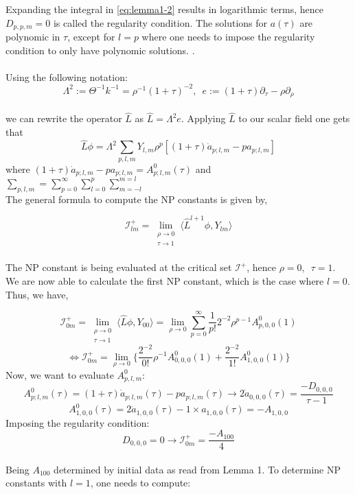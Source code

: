 \documentclass[
11pt, %
english, %
singlespacing, %
headsepline, %
]{MastersDoctoralThesis} %
\begin{document}
Expanding the integral in \eqref{eq:lemma1-2} results in logarithmic terms, hence
$D_{p,p,m} = 0$ is called the regularity condition. The solutions for
$a(\tau)$ are polynomic in $\tau$, except for $l = p$ where one needs
to impose the regularity condition to only have polynomic
solutions. \cite{MinMacKro22}.  \\ \\ Using the following notation:
$$\Lambda^2 := \Theta^{-1}k^{-1} = \rho^{-1}(1+\tau)^{-2}, \enspace e
:= (1+\tau)\partial_{\tau} - \rho\partial_{\rho}$$ \\ we can rewrite
the operator $\hat{L}$ as $\hat{L} = \Lambda^2 e$. Applying $\hat{L}$
to our scalar field one gets that
$$\hat{L}\phi = \Lambda^2\sum_{p,l,m}^{}Y_{l,m}\rho^{p}
[(1+\tau)\dot{a}_{p;l,m}-pa_{p;l,m}]$$ where
$(1+\tau)\dot{a}_{p;l,m}-pa_{p;l,m} = A^{0}_{p;l,m}(\tau)$ and $\sum_{p,l,m} = \sum_{p = 0}^{\infty}\sum_{l = 0}^{p}\sum_{m = -l}^{m =
l}$\\ The
general formula to compute the NP constants is given by,

$$\mathcal{I}^+_{lm} = \lim_{\substack{\rho \to 0 \\ \tau \to 1}}
\langle\hat{L}^{l+1}\phi, Y_{lm}\rangle$$\\ The NP constant is being
evaluated at the critical set $\mathcal{I}^+$, hence $\rho =
0, \enspace \tau = 1$.  We are now able to calculate the first NP
constant, which is the case where $l = 0$. Thus, we have,

$$\mathcal{I}^+_{0m} = \lim_{\substack{\rho \to 0 \\ \tau \to 1}} \langle\hat{L}\phi, Y_{00}\rangle = \lim_{\rho \to 0}\sum_{p = 0}^{\infty}\frac{1}{p!}2^{-2}\rho^{p-1}A^{0}_{p,0,0}(1)$$
$$ \Leftrightarrow \mathcal{I}^+_{0m} = \lim_{\rho \to 0} \biggl\{ \frac{2^{-2}}{0!}\rho^{-1}A^0_{0,0,0}(1)+\frac{2^{-2}}{1!}A^0_{1,0,0}(1) \biggr\}$$
Now, we want to evaluate $A^0_{p,l,m}$:\\
$$A^0_{p;l,m}(\tau) = (1+\tau)\dot{a}_{p;l,m}(\tau)-pa_{p;l,m}(\tau) \rightarrow 2\dot{a}_{0,0,0}(\tau) = \frac{-D_{0,0,0}}{\tau - 1}$$
$$A^0_{1,0,0}(\tau) = 2\dot{a}_{1,0,0}(\tau) - 1 \times a_{1,0,0}(\tau) = - A_{1,0,0}$$Imposing the regularity condition: 
$$D_{0,0,0} = 0 \rightarrow \mathcal{I}^+_{0m} = \frac{-A_{100}}{4}$$\\
Being $A_{100}$ determined by initial data as read from Lemma 1. To determine NP constants with $l = 1$, one needs to compute:
\end{document}
